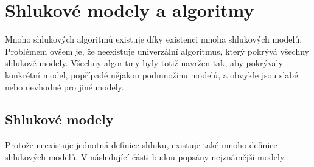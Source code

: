 \section{Shlukové modely a algoritmy} \label{sec:clustermodels}
Mnoho shlukových algoritmů existuje díky existenci mnoha shlukových modelů. Problémem ovšem je, že neexistuje univerzální algoritmus, který pokrývá všechny shlukové modely. Všechny algoritmy byly totiž navržen tak, aby pokrývaly konkrétní model, popřípadě nějakou podmnožinu modelů, a obvykle jsou slabé nebo nevhodné pro jiné modely.

\subsection{Shlukové modely}
Protože neexistuje jednotná definice shluku, existuje také mnoho definice shlu\-ko\-vý\-ch modelů. V následující části budou popsány nejznámější modely.

